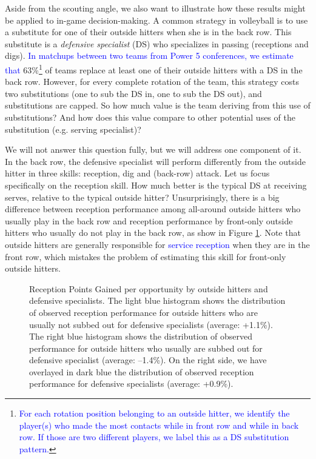 \documentclass[USenglish]{article}
\theoremstyle{dgthm}
\theoremstyle{dgdef}
\begin{document}
Aside from the scouting angle, we also want to illustrate how these results might be applied to in-game decision-making. A common strategy in volleyball is to use a substitute for one of their outside hitters when she is in the back row. This substitute is a {\it defensive specialist} (DS) who specializes in passing (receptions and digs). \textcolor{blue}{In matchups between two teams from Power 5 conferences, we estimate that} 63\%\footnote{\textcolor{blue}{For each rotation position belonging to an outside hitter, we identify the player(s) who made the most contacts while in front row and while in back row. If those are two different players, we label this as a DS substitution pattern.}} of teams replace at least one of their outside hitters with a DS in the back row. However, for every complete rotation of the team, this strategy costs two substitutions (one to sub the DS in, one to sub the DS out), and substitutions are capped. So how much value is the team deriving from this use of substitutions? And how does this value compare to other potential uses of the substitution (e.g. serving specialist)?

We will not answer this question fully, but we will address one component of it. In the back row, the defensive specialist will perform differently from the outside hitter in three skills: reception, dig and (back-row) attack. Let us focus specifically on the reception skill. How much better is the typical DS at receiving serves, relative to the typical outside hitter? Unsurprisingly, there is a big difference between reception performance among all-around outside hitters who usually play in the back row and reception performance by front-only outside hitters who usually do not play in the back row, as show in Figure \ref{fig:oh-comparison}. Note that outside hitters are generally responsible for \textcolor{blue}{service reception} when they are in the front row, which mistakes the problem of estimating this skill for front-only outside hitters.

\begin{figure}
    \centering
    \caption{Reception Points Gained per opportunity by outside hitters and defensive specialists. The light blue histogram shows the distribution of observed reception performance for outside hitters who are usually not subbed out for defensive specialists (average: +1.1\%). The right blue histogram shows the distribution of observed performance for outside hitters who usually are subbed out for defensive specialist (average: --1.4\%). On the right side, we have overlayed in dark blue the distribution of observed reception performance for defensive specialists (average: +0.9\%).}
    \label{fig:oh-comparison}
\end{figure}
\end{document}
